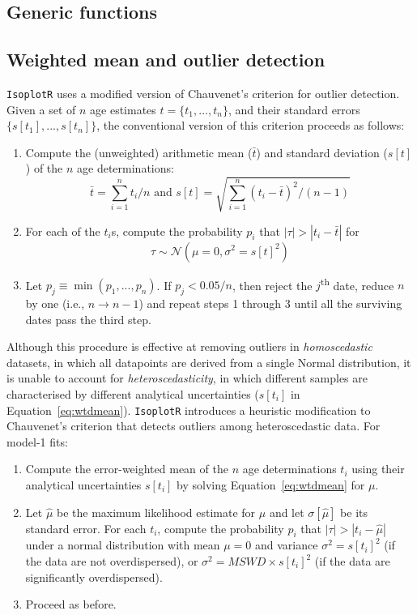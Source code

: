 \begin{refsection}
\chapter{Generic functions}\label{ch:generic}

\section{Weighted mean and outlier detection}
\label{sec:weightedmean}

\texttt{IsoplotR} uses a modified version of Chauvenet's criterion for
outlier detection. Given a set of $n$ age estimates $t = \{t_1, ...,
t_n\}$, and their standard errors $\{s[t_1], ..., s[t_n]\}$, the
conventional version of this criterion proceeds as follows:

\begin{enumerate}
\item Compute the (unweighted) arithmetic mean ($\bar{t}$) and
  standard deviation ($s[t]$) of the $n$ age determinations:
  \[
  \bar{t} = \sum_{i=1}^{n} t_i/n \mbox{~and~}
  s[t] = \sqrt{\sum_{i=1}^{n} (t_i-\bar{t})^2/(n-1)}
  \]

\item For each of the $t_i$s, compute the probability $p_i$ that
  $|\tau|>|t_i-\bar{t}|$ for
  \[
  \tau \sim \mathcal{N}(\mu=0,\sigma^2=s[t]^2)
  \]
  
\item Let $p_j \equiv \min(p_1,...,p_n)$. If $p_j<0.05/n$, then reject
  the $j$\textsuperscript{th} date, reduce $n$ by one (i.e., $n
  \rightarrow n-1$) and repeat steps 1 through 3 until all the
  surviving dates pass the third step.

\end{enumerate}

Although this procedure is effective at removing outliers in
\emph{homoscedastic} datasets, in which all datapoints are derived
from a single Normal distribution, it is unable to account for
\emph{heteroscedasticity}, in which different samples are
characterised by different analytical uncertainties ($s[t_i]$ in
Equation~\ref{eq:wtdmean}). \texttt{IsoplotR} introduces a heuristic
modification to Chauvenet's criterion that detects outliers among
heteroscedastic data. For model-1 fits:

\begin{enumerate}
\item Compute the error-weighted mean of the $n$ age determinations
  $t_i$ using their analytical uncertainties $s[t_i]$ by solving
  Equation~\ref{eq:wtdmean} for $\mu$.
\item Let $\hat{\mu}$ be the maximum likelihood estimate for $\mu$ and
  let $\sigma[\hat{\mu}]$ be its standard error. For each $t_i$,
  compute the probability $p_i$ that $|\tau|>|t_i-\hat{\mu}|$ under a
  normal distribution with mean $\mu=0$ and variance
  $\sigma^2=s[t_i]^2$ (if the data are not overdispersed), or
  $\sigma^2 = MSWD \times s[t_i]^2$ (if the data are significantly
  overdispersed).
\item Proceed as before.
\end{enumerate}


\end{refsection}
